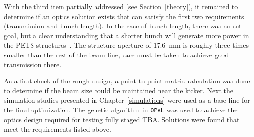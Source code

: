 With the third item partially addressed (see Section~\ref{theory}), 
it remained to determine if an optics solution exists that can satisfy the 
first two requirements (transmission and bunch length). 
In the case of bunch length, there was no set goal, but a clear understanding 
that a shorter bunch will generate more power in the PETS structures~\cite{recent-tba}. 
The structure aperture of \SI{17.6}{mm} is roughly three times smaller than the rest of the beam line, 
care must be taken to achieve good transmission there.

As a first check of the rough design, a point to point matrix calculation was done 
to determine if the beam size could be maintained near the kicker.
Next the simulation studies presented in Chapter~\ref{simulations} were used as a  
base line for the final optimization. The genetic algorithm in \verb|OPAL|
was used to achieve the optics design required for testing fully staged TBA. 
Solutions were found that meet the requirements listed above.


